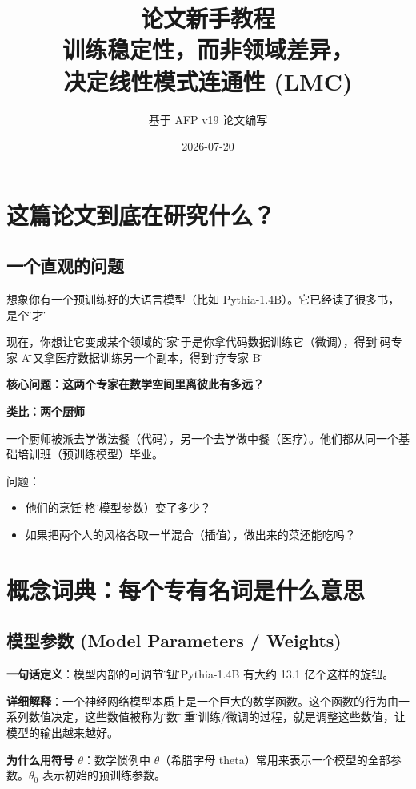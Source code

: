 \documentclass[12pt,a4paper]{article}
\title{\textbf{论文新手教程}\\[6pt]
       \Large 训练稳定性，而非领域差异，\\[3pt]
       决定线性模式连通性 (LMC)}
\author{基于 AFP v19 论文编写}
\date{2026-07-20}
\begin{document}
\maketitle
\thispagestyle{fancy}

\section{这篇论文到底在研究什么？}

\subsection{一个直观的问题}

想象你有一个预训练好的大语言模型（比如 Pythia-1.4B）。它已经读了很多书，是个\"通才\"。

现在，你想让它变成某个领域的\"专家\"。于是你拿代码数据训练它（微调），得到\"代码专家 A\"。又拿医疗数据训练另一个副本，得到\"医疗专家 B\"。

\textbf{核心问题：这两个专家在数学空间里离彼此有多远？}

\begin{tipbox}
\textbf{类比：两个厨师}

一个厨师被派去学做法餐（代码），另一个去学做中餐（医疗）。他们都从同一个基础培训班（预训练模型）毕业。

问题：
\begin{itemize}
    \item 他们的烹饪\"风格\"（模型参数）变了多少？
    \item 如果把两个人的风格各取一半混合（插值），做出来的菜还能吃吗？
\end{itemize}
\end{tipbox}

\section{概念词典：每个专有名词是什么意思}

\subsection{模型参数 (Model Parameters / Weights)}

\begin{conceptbox}
\textbf{一句话定义}：模型内部的可调节\"旋钮\"。Pythia-1.4B 有大约 13.1 亿个这样的旋钮。

\textbf{详细解释}：一个神经网络模型本质上是一个巨大的数学函数。这个函数的行为由一系列数值决定，这些数值被称为\"参数\"或\"权重\"。训练/微调的过程，就是调整这些数值，让模型的输出越来越好。

\textbf{为什么用符号 $\theta$}：数学惯例中 $\theta$（希腊字母 theta）常用来表示一个模型的全部参数。$\theta_0$ 表示初始的预训练参数。
\end{conceptbox}
\end{document}
